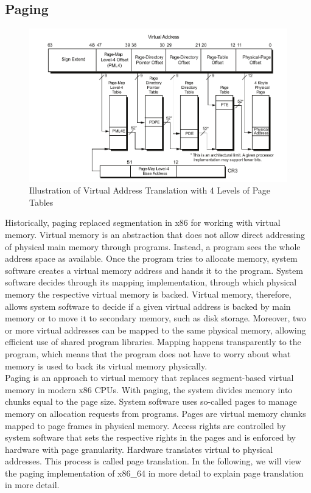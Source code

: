 \subsection{Paging}
\label{sec:state:technical:paging}
\begin{center}
    \begin{figure}
        \includegraphics[width=\textwidth]{images/paging_placeholder.png}
        \caption{Illustration of Virtual Address Translation with 4 Levels of Page Tables}
        \label{fig:state:technical:paging}
    \end{figure}
\end{center}

Historically, paging replaced segmentation in x86 for working with virtual
memory. Virtual memory is an abstraction that does not allow direct addressing
of physical main memory through programs. Instead, a program sees the whole
address space as available. Once the program tries to allocate memory, system
software creates a virtual memory address and hands it to the program. System
software decides through its mapping implementation, through which physical
memory the respective virtual memory is backed. Virtual memory, therefore,
allows system software to decide if a given virtual address is backed by main
memory or to move it to secondary memory, such as disk storage. Moreover, two
or more virtual addresses can be mapped to the same physical memory, allowing
efficient use of shared program libraries. Mapping happens transparently to the
program, which means that the program does not have to worry about what memory
is used to back its virtual memory physically.\\

Paging is an approach to virtual memory that replaces segment-based virtual
memory in modern x86 CPUs. With paging, the system divides memory into chunks
equal to the page size. System software uses so-called pages to manage memory on
allocation requests from programs. Pages are virtual memory chunks mapped to
page frames in physical memory. Access rights are controlled by system software
that sets the respective rights in the pages and is enforced by hardware with
page granularity. Hardware translates virtual to physical addresses. This
process is called page translation. In the following, we will view the paging
implementation of x86\_64 in more detail to explain page translation in more
detail.\\

